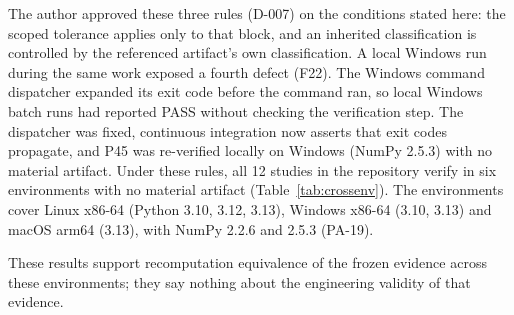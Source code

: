 The author approved these three rules (D-007) on the conditions stated here: the scoped tolerance applies only to that block, and an inherited classification is controlled by the referenced artifact's own classification. A local Windows run during the same work exposed a fourth defect (F22). The Windows command dispatcher expanded its exit code before the command ran, so local Windows batch runs had reported PASS without checking the verification step. The dispatcher was fixed, continuous integration now asserts that exit codes propagate, and P45 was re-verified locally on Windows (NumPy 2.5.3) with no material artifact. Under these rules, all 12 studies in the repository verify in six environments with no material artifact (Table~\ref{tab:crossenv}). The environments cover Linux x86-64 (Python 3.10, 3.12, 3.13), Windows x86-64 (3.10, 3.13) and macOS arm64 (3.13), with NumPy 2.2.6 and 2.5.3 (PA-19).

\begin{table}[htbp]
\centering
\caption{Cross-environment verification of all 12 studies: regenerated artifacts per comparator class. Source: the cross-environment record in \texttt{docs/}.}
\label{tab:crossenv}
\scriptsize\setlength{\tabcolsep}{3pt}

\end{table}

These results support recomputation equivalence of the frozen evidence across these environments; they say nothing about the engineering validity of that evidence.
